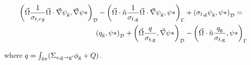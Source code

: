 \begin{equation}
\begin{split}
        \left ( \vec{\Omega}\frac{1}{\sigma_{t, rg}}\vec{\Omega}\cdot \vec{\nabla}\psi_{\mathrm{g}}, \vec{\nabla}\psi* \right)_\mathcal{D} -     \left ( \vec{\Omega}\cdot \hat{n} \frac{1}{\sigma_{t, \mathrm{g}}}\vec{\Omega} \cdot \vec{\nabla} \psi_{\mathrm{g}},\psi* \right )_{\Gamma} &+ \left ( \sigma_{t, \mathrm{g}} \psi_{\mathrm{g}}, \psi* \right )_\mathcal{D} = \\
        \left ( q_{\mathrm{g}}, \psi* \right)_\mathcal{D} + \left ( \vec{\Omega} \frac{q}{\sigma_{t, \mathrm{g}}}, \vec{\nabla}\psi* \right)_\mathcal{D} &- \left ( \vec{\Omega}\cdot \hat{n} \frac{q_{\mathrm{g}}}{\sigma_{t, \mathrm{g}}}, \psi* \right)_{\Gamma} 
    \end{split}
\end{equation}

where $q = \int_{4\pi}(\Sigma_{s, \mathrm{g} \rightarrow \mathrm{g}'}\phi_{\mathrm{g}} + Q)$.
